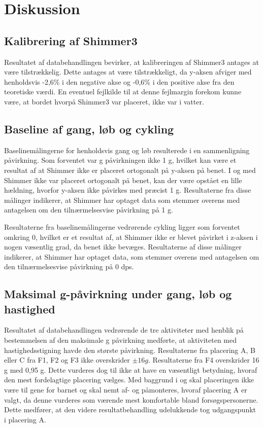 \section{Diskussion}
\subsection{Kalibrering af Shimmer3}
Resultatet af databehandlingen bevirker, at kalibreringen af Shimmer3 antages at være tilstrækkelig. Dette antages at være tilstrækkeligt, da y-aksen  afviger med henholdsvis -2,6\% i den negative akse og -0,6\% i den positive akse fra den teoretiske værdi. En eventuel fejlkilde til at denne fejlmargin forekom kunne være, at bordet hvorpå Shimmer3 var placeret, ikke var i vatter.

\subsection{Baseline af gang, løb og cykling}
Baselinemålingerne for henholdsvis gang og løb resulterede i en sammenligning påvirkning. Som forventet var g påvirkningen ikke 1 g, hvilket kan være et resultat af at Shimmer ikke er placeret ortogonalt på y-aksen på benet. I og med Shimmer ikke var placeret ortogonalt på benet, kan der være opstået en lille hældning, hvorfor y-aksen ikke påvirkes med præcist 1 g. Resultaterne fra disse målinger indikerer, at Shimmer har optaget data som stemmer overens med antagelsen om den tilnærmelsesvise påvirkning på 1 g. 

Resultaterne fra baselinemålingerne vedrørende cykling ligger som forventet omkring 0, hvilket er et resultat af, at Shimmer ikke er blevet påvirket i z-aksen i nogen væsentlig grad, da benet ikke bevæges. Resultaterne af disse målinger indikerer, at Shimmer har optaget data, som stemmer overens med antagelsen om den tilnærmelsesvise påvirkning på 0 dps. 

\subsection{Maksimal g-påvirkning under gang, løb og hastighed} \label{app:maxg}
Resultatet af databehandlingen vedrørende de tre aktiviteter med henblik på bestemmelsen af den maksimale g påvirkning medførte, at aktiviteten med hastighedsstigning havde den største påvirkning. Resultaterne fra placering A, B eller C fra F1, F2 og F3 ikke overskrider $\pm 16g$. Resultaterne fra F4 overskrider 16 g med 0,95 g. Dette vurderes dog til ikke at have en væsentligt betydning, hvoraf den mest fordelagtige placering vælges. Med baggrund i  og  skal placeringen ikke være til gene for barnet og skal nemt af- og påmonteres, hvoraf placering A er valgt, da denne vurderes som værende mest komfortable bland forsøgspersonerne. Dette medfører, at den videre resultatbehandling udelukkende tog udgangspunkt i placering A. 

